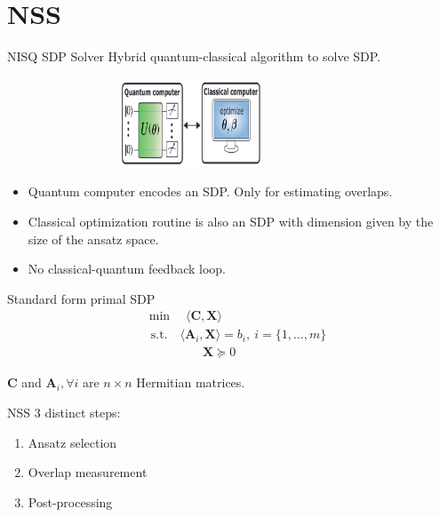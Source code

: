 \documentclass{beamer}
\newcommand{\Amat}{\mathbf{A}}
\newcommand{\Cmat}{\mathbf{C}}
\newcommand{\Xmat}{\mathbf{X}}
\newcommand{\st}{\mathrm{s.t.}}
\begin{document}
\section{NSS}
	\begin{frame}{NISQ SDP Solver}
		Hybrid quantum-classical algorithm to solve SDP.
		\begin{figure}
			\centering
			\includegraphics[height=75pt, width=250pt]{NSS.png}
		\end{figure}
		\begin{itemize}
			\item[] Quantum computer encodes an SDP. Only for estimating overlaps.
			\item[] Classical optimization routine is also an SDP with dimension given by the size of the ansatz space.
			\item[] No classical-quantum feedback loop.
		\end{itemize}
		
	\end{frame}

	\begin{frame}{Standard form primal SDP}
		\begin{equation}
			\begin{aligned}
				& \min \quad \langle \Cmat, \Xmat \rangle \nonumber \\
				& \hspace{5pt} \st \quad \langle \Amat_i, \Xmat \rangle = b_i,\ i = \{1, \dots, m\} \nonumber \\
				& \hspace{55pt} \Xmat \succcurlyeq 0 \nonumber
			\end{aligned}
		\end{equation}
		\vfill
		\begin{center}
			$\Cmat$ and $\Amat_i, \forall i$ are $n \times n$ Hermitian matrices.
		\end{center}
	\end{frame}

	\begin{frame}{NSS}
		3 distinct steps:
		\begin{enumerate}
			\item Ansatz selection
			\item Overlap measurement
			\item Post-processing
		\end{enumerate}
	\end{frame}
\end{document}
